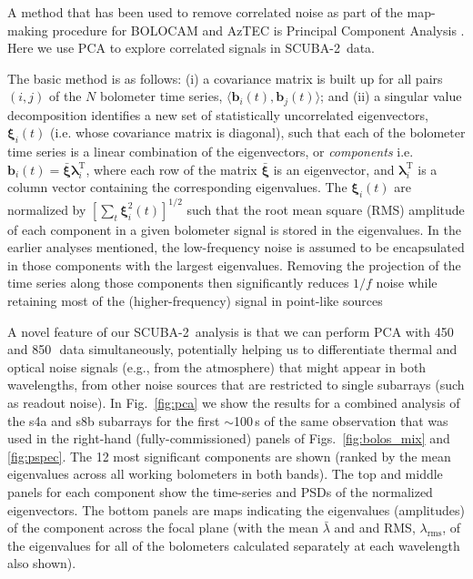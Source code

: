 \documentclass[useAMS,usenatbib,nofootinbib]{mn2e}
\newcommand{\scuba}{SCUBA-2}
\newcommand{\rms}{RMS}
\begin{document}
A method that has been used to remove correlated noise as part of the
map-making procedure for BOLOCAM and AzTEC is Principal Component
Analysis \citep[PCA,][]{laurent2005,scott2008}. Here we use PCA to
explore correlated signals in \scuba\ data.

The basic method is as follows: (i) a covariance matrix is built up
for all pairs $(i,j)$ of the $N$ bolometer time series,
$\langle\mathbf{b}_i(t),\mathbf{b}_j(t)\rangle$; and (ii) a singular
value decomposition identifies a new set of statistically uncorrelated
eigenvectors, $\mathbf{\xi}_i(t)$ (i.e. whose covariance matrix is
diagonal), such that each of the bolometer time series is a linear
combination of the eigenvectors, or \emph{components}
i.e. $\mathbf{b}_i(t) = \bar{\mathbf{\xi}}
\mathbf{\lambda}_i^\mathrm{T}$, where each row of the matrix
$\bar{\mathbf{\xi}}$ is an eigenvector, and
$\mathbf{\lambda}_i^\mathrm{T}$ is a column vector containing the
corresponding eigenvalues. The $\mathbf{\xi}_i(t)$ are normalized by
$[\sum_t \mathbf{\xi}_i^2(t)]^{1/2}$ such that the root mean square
(\rms) amplitude of each component in a given bolometer signal is
stored in the eigenvalues. In the earlier analyses mentioned, the
low-frequency noise is assumed to be encapsulated in those components
with the largest eigenvalues. Removing the projection of the time
series along those components then significantly reduces $1/f$ noise
while retaining most of the (higher-frequency) signal in point-like
sources

A novel feature of our \scuba\ analysis is that we can perform PCA
with 450 and 850\,\micron\ data simultaneously, potentially helping us
to differentiate thermal and optical noise signals (e.g., from the
atmosphere) that might appear in both wavelengths, from other noise
sources that are restricted to single subarrays (such as readout
noise). In Fig.~\ref{fig:pca} we show the results for a combined
analysis of the s4a and s8b subarrays for the first $\sim$100\,s of
the same observation that was used in the right-hand
(fully-commissioned) panels of Figs.~\ref{fig:bolos_mix} and
\ref{fig:pspec}. The 12 most significant components are shown (ranked
by the mean eigenvalues across all working bolometers in both
bands). The top and middle panels for each component show the
time-series and PSDs of the normalized eigenvectors. The bottom panels
are maps indicating the eigenvalues (amplitudes) of the component
across the focal plane (with the mean $\bar{\lambda}$ and and \rms,
$\lambda_\mathrm{rms}$, of the eigenvalues for all of the bolometers
calculated separately at each wavelength also shown).
\end{document}
